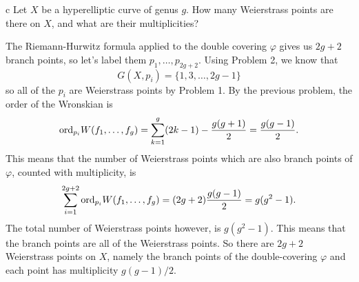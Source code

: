 \documentclass[expanded]{lkx_pset}
\begin{document}
\begin{parts}
	\begin{part}{c}
		Let $X$ be a hyperelliptic curve of genus $g$. How many
		Weierstrass points are there on $X$, and what are their
		multiplicities?
	\end{part}

	The Riemann-Hurwitz formula applied to the double covering $\varphi$ gives us $2g+2$ branch points, so let's label them $p_1,\ldots, p_{2g+2}$. Using Problem 2, we know that
	\[
		G(X, p_i) = \{ 1, 3,\ldots, 2g-1\}
	\]
	so all of the $p_i$ are Weierstrass points by Problem 1. By the previous problem, the order of the Wronskian is
	\[
		\mathrm{ord}_{p_i} W(f_1,\ldots, f_g) = \sum^g_{k=1}(2k-1) - \frac{g(g+1)}{2} = \frac{g(g-1)}{2}.
	\]
	This means that the number of Weierstrass points which are also branch points of $\varphi$, counted with multiplicity, is
	\[
		\sum_{i=1}^{2g+2}\mathrm{ord}_{p_i} W(f_1,\ldots, f_g) = (2g+2)\frac{g(g-1)}{2} = g(g^2-1).
	\]
	The total number of Weierstrass points however, is $g(g^2-1)$. This means that the branch points are all of the Weierstrass points. So there are $2g+2$ Weierstrass points on $X$, namely the branch points of the double-covering $\varphi$ and each point has multiplicity $g(g-1)/2$.
\end{parts}
\end{document}
